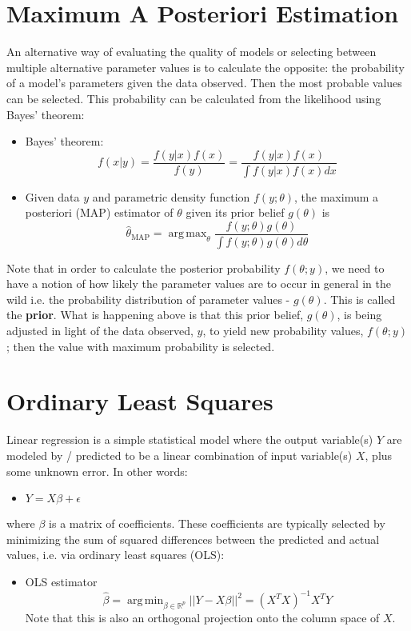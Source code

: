 \documentclass{article}
\DeclareMathOperator*{\argmax}{arg\,max}
\DeclareMathOperator*{\argmin}{arg\,min}
\begin{document}
\section{Maximum A Posteriori Estimation}
An alternative way of evaluating the quality of models or selecting between multiple alternative parameter values is to calculate the opposite: the probability of a model's parameters given the data observed. Then the most probable values can be selected. This probability can be calculated from the likelihood using Bayes' theorem:
\begin{itemize}
    \item Bayes' theorem:
    \begin{equation}
        f(x|y) = \frac{f(y|x)f(x)}{f(y)} = \frac{f(y|x)f(x)}{\int f(y|x)f(x)dx}
    \end{equation}
    \item Given data $y$ and parametric density function $f(y; \theta)$, the maximum a posteriori (MAP) estimator of $\theta$ given its prior belief $g(\theta)$ is
    \begin{equation}
        \hat{\theta}_{\text{MAP}} = \argmax_{\theta}\frac{f(y; \theta)g(\theta)}{\int f(y; \theta)g(\theta)d\theta}
    \end{equation}
\end{itemize}
Note that in order to calculate the posterior probability $f(\theta;y)$, we need to have a notion of how likely the parameter values are to occur in general in the wild i.e. the probability distribution of parameter values - $g(\theta)$. This is called the \textbf{prior}. What is happening above is that this prior belief, $g(\theta)$, is being adjusted in light of the data observed, $y$, to yield new probability values, $f(\theta;y)$; then the value with maximum probability is selected.
\section{Ordinary Least Squares}
Linear regression is a simple statistical model where the output variable(s) $Y$ are modeled by / predicted to be  a linear combination of input variable(s) $X$, plus some unknown error. In other words:
\begin{itemize}
    \item $Y = X\beta + \epsilon$
\end{itemize}
where $\beta$ is a matrix of coefficients. These coefficients are typically selected by minimizing the sum of squared differences between the predicted and actual values, i.e. via ordinary least squares (OLS):
\begin{itemize}
    \item OLS estimator
    \begin{equation}
        \hat{\beta} = \argmin_{\beta\in\mathbb{R}^p}||Y-X\beta||^2  = (X^TX)^{-1}X^TY
    \end{equation}
    Note that this is also an orthogonal projection onto the column space of $X$.
\end{itemize}
\end{document}
